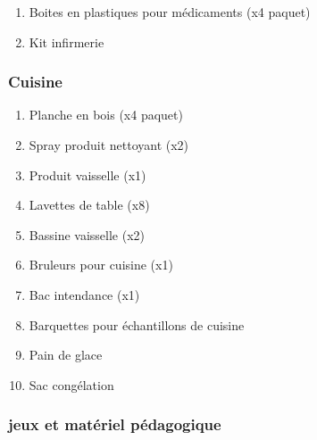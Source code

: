 \documentclass{article}
\begin{document}
\begin{enumerate}
    \item Boites en plastiques pour médicaments (x4 paquet)
    \item Kit infirmerie
\end{enumerate}


\subsubsection{Cuisine}

\begin{enumerate}
    \item Planche en bois (x4 paquet)
    \item Spray produit nettoyant  (x2)
    \item Produit vaisselle (x1)
    \item Lavettes de table (x8)
    \item Bassine vaisselle (x2)
    \item Bruleurs pour cuisine (x1)
    \item Bac intendance (x1)
    \item Barquettes pour échantillons de cuisine 
    \item Pain de glace
    \item Sac congélation
    
\end{enumerate}

\subsubsection{jeux et matériel pédagogique}
\end{document}

